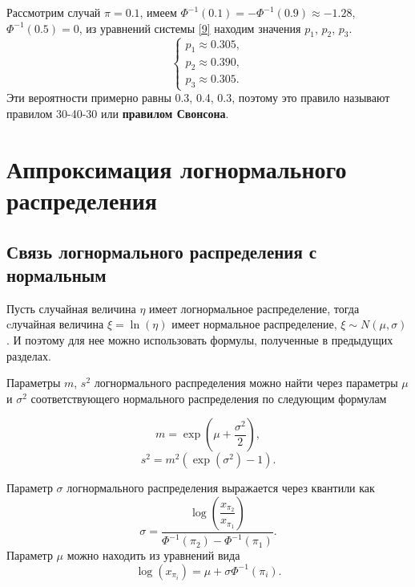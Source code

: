 \documentclass[12pt]{article}
\begin{document}
	
	Рассмотрим случай $\pi = 0.1$, имеем $\Phi ^{-1}(0.1) = -\Phi ^{-1}(0.9) \approx  -1.28$, $\Phi ^{-1}(0.5) = 0$, из уравнений системы \eqref{9} находим значения $p_{1}$, $p_{2}$, $p_{3}$.
	\begin{equation*}
		\begin{cases}
			p_{1}\approx 0.305, \\ 
			p_{2}\approx 0.390,  \\ 
			p_{3}\approx 0.305.
		\end{cases}
	\end{equation*}
	Эти вероятности примерно равны 0.3, 0.4, 0.3, поэтому это правило называют правилом 30-40-30 или \textbf{правилом Свонсона}.
	
	\section{Аппроксимация логнормального распределения}
	\subsection{Связь логнормального распределения с нормальным}
	Пусть случайная величина $\eta$ имеет логнормальное распределение, тогда cлучайная величина $\xi = \ln(\eta)$ имеет нормальное распределение, $\xi \sim N(\mu, \sigma)$. И поэтому для нее можно использовать формулы, полученные в предыдущих разделах.
	
	Параметры $m$, $s^{2}$ логнормального распределения можно найти через параметры $\mu$ и $\sigma^{2}$ соответствующего нормального распределения по следующим формулам
	
	\begin{equation}
		m = \exp\left( \mu+\frac{\sigma ^{2}}{2}\right) ,
	\end{equation} \label{10}
	\begin{equation}
		s^{2} = m^{2}(\exp(\sigma^{2})-1).
	\end{equation}

Параметр $\sigma$ логнормального распределения выражается через квантили как
\begin{equation*}
	\displaystyle{\sigma = \dfrac{\log\left(\dfrac{x_{\pi_{2}}}{x_{\pi_{1}}}\right)}{\Phi ^{-1}(\pi_{2}) - \Phi ^{-1}(\pi_{1})}}.
\end{equation*} \label{13}
Параметр $\mu$ можно находить из уравнений вида
\begin{equation*}
	\log(x_{\pi_{i}}) = \mu + \sigma\Phi ^{-1}(\pi_{i}).
\end{equation*}
	
\end{document}
